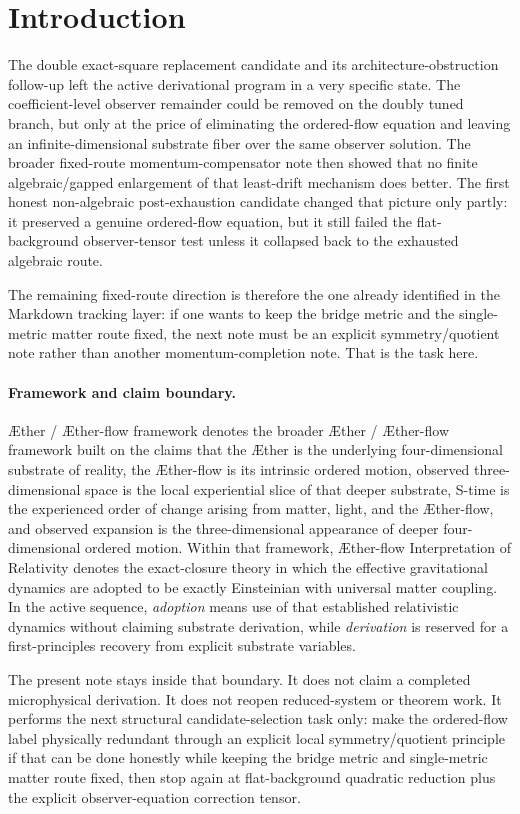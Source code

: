 \documentclass[11pt]{article}
\newcommand{\Aether}{\AE{}ther}
\newcommand{\Aflow}{\AE{}ther-flow}
\newcommand{\TheoryName}{\Aflow{} Interpretation of Relativity}
\newcommand{\TheoryProgram}{\Aether{} / \Aflow{} framework}
\begin{document}
\section{Introduction}

The double exact-square replacement candidate and its architecture-obstruction follow-up left the active derivational program in a very specific state. The coefficient-level observer remainder could be removed on the doubly tuned branch, but only at the price of eliminating the ordered-flow equation and leaving an infinite-dimensional substrate fiber over the same observer solution. The broader fixed-route momentum-compensator note then showed that no finite algebraic/gapped enlargement of that least-drift mechanism does better. The first honest non-algebraic post-exhaustion candidate changed that picture only partly: it preserved a genuine ordered-flow equation, but it still failed the flat-background observer-tensor test unless it collapsed back to the exhausted algebraic route.

The remaining fixed-route direction is therefore the one already identified in the Markdown tracking layer: if one wants to keep the bridge metric and the single-metric matter route fixed, the next note must be an explicit symmetry/quotient note rather than another momentum-completion note. That is the task here.

\paragraph{Framework and claim boundary.}
\TheoryProgram{} denotes the broader \Aether{} / \Aflow{} framework built on the claims that the \Aether{} is the underlying four-dimensional substrate of reality, the \Aflow{} is its intrinsic ordered motion, observed three-dimensional space is the local experiential slice of that deeper substrate, S-time is the experienced order of change arising from matter, light, and the \Aflow{}, and observed expansion is the three-dimensional appearance of deeper four-dimensional ordered motion. Within that framework, \TheoryName{} denotes the exact-closure theory in which the effective gravitational dynamics are adopted to be exactly Einsteinian with universal matter coupling. In the active sequence, \emph{adoption} means use of that established relativistic dynamics without claiming substrate derivation, while \emph{derivation} is reserved for a first-principles recovery from explicit substrate variables.

The present note stays inside that boundary. It does not claim a completed microphysical derivation. It does not reopen reduced-system or theorem work. It performs the next structural candidate-selection task only: make the ordered-flow label physically redundant through an explicit local symmetry/quotient principle if that can be done honestly while keeping the bridge metric and single-metric matter route fixed, then stop again at flat-background quadratic reduction plus the explicit observer-equation correction tensor.
\end{document}
